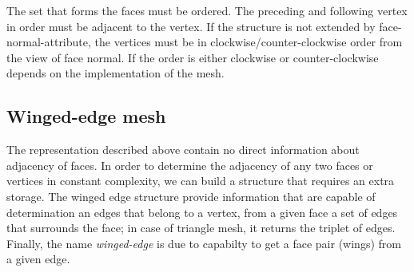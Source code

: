 The set that forms the faces must be ordered. The preceding and following vertex in order must be 
adjacent to
the vertex. If the structure is not extended by face-normal-attribute, the vertices must be in 
clockwise/counter-clockwise order from the view of face normal. If the order is either clockwise or counter-clockwise
depends on the implementation of the mesh.

\subsection{Winged-edge mesh}

The representation described above contain no direct information about adjacency of faces. 
In order to determine the adjacency of any two faces or vertices in constant complexity, we
can build a structure that requires an extra storage. The winged edge structure provide information
that are capable of determination an edges that belong to a vertex, from a given face a set
of edges that surrounds the face; in case of triangle mesh, it returns the triplet of edges.
Finally, the name \emph{winged-edge} is due to capabilty to get a face pair (wings) from
a given edge.

